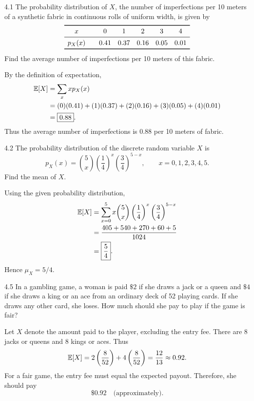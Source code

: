 \documentclass[11pt,oneside]{article}
\begin{document}

\begin{exercise}{4.1}
The probability distribution of $X$, the number of imperfections per 10 meters of a synthetic fabric in continuous rolls of uniform width, is given by
\[
\begin{array}{c@{\qquad}ccccc}
\toprule
x & 0 & 1 & 2 & 3 & 4 \\
\midrule
p_X(x) & 0.41 & 0.37 & 0.16 & 0.05 & 0.01 \\
\bottomrule
\end{array}
\]
Find the average number of imperfections per 10 meters of this fabric.
\end{exercise}
\begin{solution}
By the definition of expectation,
\[
\begin{aligned}
    \mathbb{E}[X]&=\sum_x x p_X(x) \\
    &=(0)(0.41)+(1)(0.37)+(2)(0.16)+(3)(0.05)+(4)(0.01) \\
    &=\boxed{0.88}.
\end{aligned}
\]
Thus the average number of imperfections is $0.88$ per 10 meters of fabric.
\end{solution}

\begin{exercise}{4.2}
The probability distribution of the discrete random variable $X$ is
\[
    p_X(x)=\binom{5}{x}\left(\frac14\right)^x\left(\frac34\right)^{5-x},
    \qquad x=0,1,2,3,4,5.
\]
Find the mean of $X$.
\end{exercise}
\begin{solution}
Using the given probability distribution,
\[
\begin{aligned}
    \mathbb{E}[X]&=\sum_{x=0}^{5}x\binom{5}{x}\left(\frac14\right)^x\left(\frac34\right)^{5-x}\\
    &=\frac{405+540+270+60+5}{1024}\\
    &=\boxed{\frac54}.
\end{aligned}
\]
Hence $\mu_X=5/4$.
\end{solution}

\begin{exercise}{4.5}
In a gambling game, a woman is paid $\$2$ if she draws a jack or a queen and $\$4$ if she draws a king or an ace from an ordinary deck of 52 playing cards. If she draws any other card, she loses. How much should she pay to play if the game is fair?
\end{exercise}
\begin{solution}
Let $X$ denote the amount paid to the player, excluding the entry fee. There are $8$ jacks or queens and $8$ kings or aces. Thus
\[
    \mathbb{E}[X]=2\left(\frac{8}{52}\right)+4\left(\frac{8}{52}\right)=\frac{12}{13}\approx0.92.
\]
For a fair game, the entry fee must equal the expected payout. Therefore, she should pay
\[\boxed{\$0.92}\quad\text{(approximately)}.\]
\end{solution}
\end{document}
